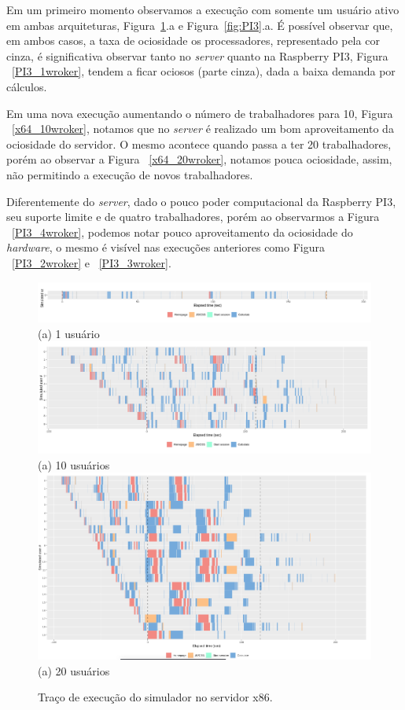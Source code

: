 \documentclass[12pt,english,brazil]{article}
\begin{document}
Em um primeiro momento observamos a execução com somente um usuário ativo em ambas arquiteturas, Figura~\ref{fig:x64}.a e Figura~\ref{fig:PI3}.a. É possível observar que, em ambos casos, a taxa de ociosidade os processadores, representado pela cor cinza, é significativa observar tanto no \emph{server} quanto na Raspberry PI3, Figura ~\ref{PI3_1wroker}, tendem a ficar ociosos (parte cinza), dada a baixa demanda por cálculos. 

Em uma nova execução aumentando o número de trabalhadores para 10, Figura ~\ref{x64_10wroker}, notamos que no \emph{server} é realizado um bom aproveitamento da ociosidade do servidor. O mesmo acontece quando passa a ter 20 trabalhadores, porém ao observar a Figura ~\ref{x64_20wroker}, notamos pouca ociosidade, assim, não permitindo a execução de novos trabalhadores.

Diferentemente do \emph{server}, dado o pouco poder computacional da Raspberry PI3, seu suporte limite e de quatro trabalhadores, porém ao observarmos a Figura ~\ref{PI3_4wroker}, podemos notar pouco aproveitamento da ociosidade do \emph{hardware}, o mesmo é visível nas execuções anteriores como Figura ~\ref{PI3_2wroker} e ~\ref{PI3_3wroker}.



\begin{figure}[htbp]
  \centering 
  \includegraphics[scale=.4]{paperWSCAD2021/figures/user_x64_1_worker.png}\\(a) 1 usuário
    \includegraphics[scale=.4]{paperWSCAD2021/figures/user_x64_10_worker.png}\\(a) 10 usuários
  \includegraphics[scale=.4]{paperWSCAD2021/figures/user_x64_20_worker.png}\\(a) 20 usuários
\caption{Traço de execução do simulador no servidor x86.}
  \label{fig:x64}
\end{figure}
\end{document}
